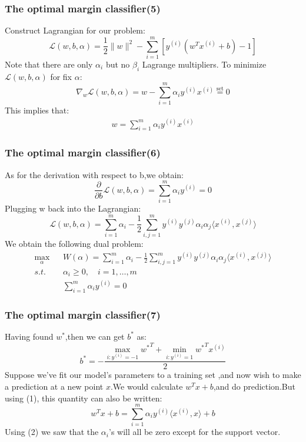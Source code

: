 \documentclass[slidestop,compress,mathserif]{beamer}
\begin{document}
    \begin{frame}[shrink]
    	\frametitle{The optimal margin classifier(5)}
    	Construct Lagrangian for our problem:
    	$$ \mathcal{L}(w,b,\alpha)=\frac{1}{2}
    	\|w\|^2-\sum_{i=1}^m[y^{(i)}(w^Tx^{(i)}+b)-1]$$
    	Note that there are only $\alpha_i$ but no $\beta_i$ 
    	Lagrange multipliers.
    	To minimize $\mathcal{L}(w,b,\alpha)$ for fix $\alpha$:
    	$$\nabla_w\mathcal{L}(w,b,\alpha)=w-\sum_{i=1}^m\alpha_i
    	y^{(i)}x^{(i)}\stackrel{\mathrm{set}}{=}0$$
    	This implies that:
    	\begin{eqnarray}
    		w=\sum_{i=1}^m\alpha_iy^{(i)}x^{(i)}
    	\end{eqnarray}
    \end{frame}
    \begin{frame}[shrink]
    	\frametitle{The optimal margin classifier(6)}
    	As for the derivation with respect to b,we obtain:
    	\begin{equation}
    		\frac{\partial}{\partial b}\mathcal{L}(w,b,\alpha)=
    		\sum_{i=1}^m\alpha_iy^{(i)}=0
    	\end{equation}
    	Plugging w back into the Lagrangian:
    	$$\mathcal{L}(w,b,\alpha)=\sum_{i=1}^m\alpha_i-\frac{1}{2}
    	\sum_{i,j=1}^my^{(i)}y^{(j)}\alpha_i\alpha_j\langle 
    	x^{(i)},x^{(j)}\rangle$$
    	We obtain the following dual problem:
    	\begin{eqnarray*}
    		\max_\alpha && W(\alpha)=\sum_{i=1}^m\alpha_i-
    		\frac{1}{2}\sum_{i,j=1}^my^{(i)}y^{(j)}
    		\alpha_i\alpha_j\langle x^{(i)},x^{(j)}\rangle \\
    		s.t. && \alpha_i \ge 0,\quad i=1,\ldots,m\\
    		&& \sum_{i=1}^m\alpha_iy^{(i)}=0
    	\end{eqnarray*}
    \end{frame}
    \begin{frame}[shrink]
    	\frametitle{The optimal margin classifier(7)}
    	Having found $w^*$,then we can get $b^*$ as:
    	$$b^*=-\frac{\max_{i:y^{(i)}=-1}{w^*}^T+\min_{i:y^{(i)}=1}
    	{w^*}^Tx^{(i)}}{2}$$
    	Suppose we've fit our model's parameters to a training set
    	,and now wish to make a prediction at a new point $x$.We
    	 would calculate $w^Tx+b$,and do prediction.But using (1),
    	 this quantity can also be written:
    	$$w^Tx+b=\sum_{i=1}^m\alpha_iy^{(i)}\langle x^{(i)},x\rangle+b$$
    	Using (2) we saw that the $\alpha_i$'s will all be zero
    	 except for the support vector.   	     	
    \end{frame}
\end{document}
